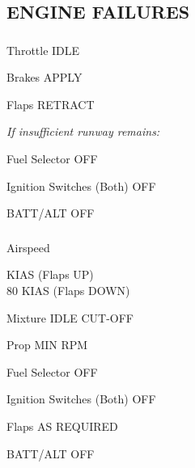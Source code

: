 \begin{multicols}{2}

\subsection*{ENGINE FAILURES}


\subsubsection*{}

\begin{enumerate*}
  \item Throttle \dotfill IDLE
  \item Brakes \dotfill APPLY
  \item Flaps \dotfill RETRACT
  \item \emph{If insufficient runway remains:}
  \begin{itemize*}
    \item Fuel Selector \dotfill OFF
    \item Ignition Switches (Both) \dotfill OFF
    \item BATT/ALT \dotfill OFF
    \end{itemize*}
  \end{enumerate*}

\subsubsection*{}

\begin{enumerate*}
\item Airspeed \raggedright {} KIAS (Flaps UP)\\\hfill80 KIAS (Flaps DOWN)
\item Mixture \dotfill IDLE CUT-OFF
\item Prop \dotfill MIN RPM
\item Fuel Selector \dotfill OFF
\item Ignition Switches (Both) \dotfill OFF
\item Flaps \dotfill AS REQUIRED
\item BATT/ALT \dotfill OFF
\end{enumerate*}


\end{multicols}
